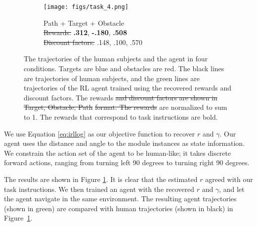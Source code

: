 \documentclass[12pt]{report}	%
\theoremstyle{definition}
\theoremstyle{remark}
\providecommand{\DIFadd}[1]{{\protect\color{blue}\uwave{#1}}} %
\providecommand{\DIFdel}[1]{{\protect\color{red}\sout{#1}}}                      %
\providecommand{\DIFaddFL}[1]{\DIFadd{#1}} %
\providecommand{\DIFdelFL}[1]{\DIFdel{#1}} %
\providecommand{\DIFaddbeginFL}{} %
\providecommand{\DIFaddendFL}{} %
\providecommand{\DIFdelbeginFL}{} %
\providecommand{\DIFdelendFL}{} %
\begin{document}
\begin{figure}
\begin{subfigure}[b]{0.48\textwidth}
\texttt{[image: figs/task\_4.png]}
\caption{Path + Target + Obstacle \\
\DIFdelbeginFL \DIFdelFL{Rewards: }%
\DIFdelendFL \DIFaddbeginFL \DIFaddFL{$R^T=$}\DIFaddendFL {\bf .312}, \DIFaddbeginFL \DIFaddFL{$R^O=$}\DIFaddendFL {\bf -.180}, \DIFaddbeginFL \DIFaddFL{$R^P=$}\DIFaddendFL {\bf .508}\DIFdelbeginFL %
\DIFdelendFL \\
\DIFdelbeginFL \DIFdelFL{Discount factors: }%
\DIFdelendFL \DIFaddbeginFL \DIFaddFL{$\gamma^T=$}\DIFaddendFL .148, \DIFaddbeginFL \DIFaddFL{$\gamma^O=$}\DIFaddendFL .100, \DIFaddbeginFL \DIFaddFL{$\gamma^P=$}\DIFaddendFL .570\DIFdelbeginFL %
\DIFdelendFL }
\end{subfigure}
\caption{The trajectories of the human subjects and the agent in four conditions. Targets are
blue and obstacles are red. The black lines are trajectories of human subjects,
and the green lines are trajectories of the RL agent trained using the recovered
rewards and discount factors. The rewards \DIFdelbeginFL \DIFdelFL{and discount factors are shown in }%
\DIFdelFL{Target,
Obstacle, Path}%
\DIFdelFL{format. The rewards }\DIFdelendFL are normalized to sum to 1. The rewards that
correspond to task instructions are bold.}
\label{fig:exp}
\end{figure}

We use Equation \ref{eq:irllog} as our objective function to recover $r$ and $\gamma$. Our agent uses the distance and angle to the module instances as state information. We constrain the action set of the agent to be human-like; it takes discrete forward actions, ranging from turning left 90 degrees to turning right 90 degrees. 

The results are shown in Figure \ref{fig:exp}. It is clear that the estimated $r$ agreed with our task instructions. We then trained an agent with the recovered $r$ and $\gamma$, and let the agent navigate in the same environment. The resulting agent trajectories (shown in green) are compared with human trajectories (shown in black) in Figure~\ref{fig:exp}. 
\end{document}

